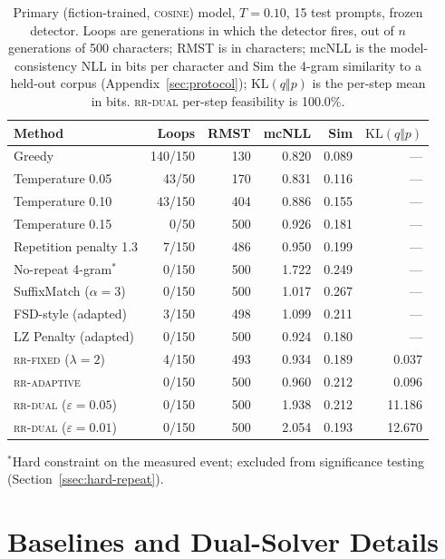 \documentclass[make,article,submit,pdftex]{Definitions/mdpi}
\providecommand{\KL}{}\renewcommand{\KL}{\mathrm{KL}}
\begin{document}
\begin{table}[H]
\centering
\caption{Primary (fiction-trained, \textsc{cosine}) model, $T{=}0.10$, 15 test prompts, frozen detector. Loops are generations in which the detector fires, out of $n$ generations of 500 characters; RMST is in characters; mcNLL is the model-consistency NLL in bits per character and Sim the 4-gram similarity to a held-out corpus (Appendix~\ref{sec:protocol}); $\KL(q\Vert p)$ is the per-step mean in bits. \textsc{rr-dual} per-step feasibility is 100.0\%.}
\label{tab:main}
\begin{tabular}{@{}lrrrrr@{}}
\toprule
Method & Loops & RMST & mcNLL & Sim & $\KL(q\Vert p)$ \\
\midrule
Greedy & 140/150 & 130   & 0.820 & 0.089 & --- \\
Temperature 0.05 & 43/50 & 170   & 0.831 & 0.116 & --- \\
Temperature 0.10 & 43/150 & 404   & 0.886 & 0.155 & --- \\
Temperature 0.15 & 0/50 & 500   & 0.926 & 0.181 & --- \\
Repetition penalty 1.3 & 7/150 & 486   & 0.950 & 0.199 & --- \\
No-repeat 4-gram$^{*}$ & 0/150 & 500   & 1.722 & 0.249 & --- \\
SuffixMatch ($\alpha{=}3$) & 0/150 & 500   & 1.017 & 0.267 & --- \\
FSD-style (adapted) & 3/150 & 498   & 1.099 & 0.211 & --- \\
LZ Penalty (adapted) & 0/150 & 500   & 0.924 & 0.180 & --- \\
\textsc{rr-fixed} ($\lambda{=}2$) & 4/150 & 493   & 0.934 & 0.189 & 0.037 \\
\textsc{rr-adaptive} & 0/150 & 500   & 0.960 & 0.212 & 0.096 \\
\textsc{rr-dual} ($\varepsilon{=}0.05$) & 0/150 & 500 & 1.938 & 0.212 & 11.186 \\
\textsc{rr-dual} ($\varepsilon{=}0.01$) & 0/150 & 500 & 2.054 & 0.193 & 12.670 \\
\bottomrule
\end{tabular}

\vspace{4pt}
{\footnotesize $^{*}$Hard constraint on the measured event; excluded from significance testing (Section~\ref{ssec:hard-repeat}).}
\end{table}

\section{Baselines and Dual-Solver Details}
\label{app:baselines}
\end{document}
